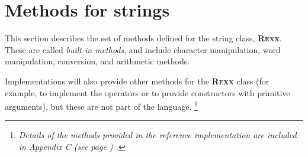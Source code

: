 \chapter{Methods for \nr{} strings}\label{refbmeth}
 This section describes the set of methods defined for the \nr{}
string class, \textbf{R\textsc{exx}}.  These are called \emph{built-in
methods}, and include character manipulation, word manipulation,
conversion, and arithmetic methods.
 
Implementations will also provide other methods for the \textbf{R\textsc{exx}}
class (for example, to implement the \nr{} operators or to provide
constructors with primitive arguments), but these are not part of the
\nr{} language.
\footnote{
\emph{Details of the methods provided in the reference implementation are
included in  Appendix C (see page \pageref{refappc}) .}
}
